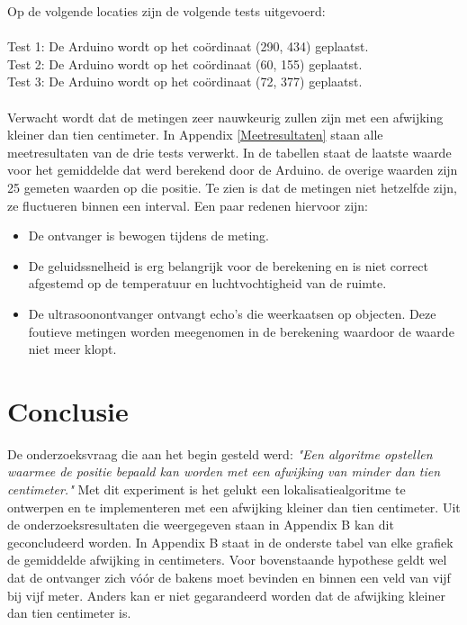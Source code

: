 \documentclass{article}
\begin{document}
Op de volgende locaties zijn de volgende tests uitgevoerd:\\
\\
\indent Test 1: De Arduino wordt op het co\"{o}rdinaat (290, 434) geplaatst. \\
\indent Test 2: De Arduino wordt op het co\"{o}rdinaat (60, 155) geplaatst. \\
\indent Test 3: De Arduino wordt op het co\"{o}rdinaat (72, 377) geplaatst. \\
\\
Verwacht wordt dat de metingen zeer nauwkeurig zullen zijn met een afwijking kleiner dan tien centimeter. 
In Appendix \ref{Meetresultaten} staan alle meetresultaten van de drie tests verwerkt. In de tabellen staat de laatste waarde voor het gemiddelde dat werd berekend door de Arduino. de overige waarden zijn 25 gemeten waarden op die positie. Te zien is dat de metingen niet hetzelfde zijn, ze fluctueren binnen een interval. Een paar redenen hiervoor zijn: 
\begin{itemize}
	\item De ontvanger is bewogen tijdens de meting.
	\item De geluidssnelheid is erg belangrijk voor de berekening en is niet correct afgestemd op de temperatuur en luchtvochtigheid van de ruimte. 
	\item De ultrasoonontvanger ontvangt echo's die weerkaatsen op objecten. Deze foutieve metingen worden meegenomen in de berekening waardoor de waarde niet meer klopt. 
\end{itemize}

\section{Conclusie}
De onderzoeksvraag die aan het begin gesteld werd: \textit{"Een algoritme opstellen waarmee de positie bepaald kan worden met een afwijking van minder dan tien centimeter."} Met dit experiment is het gelukt een lokalisatiealgoritme te ontwerpen en te implementeren met een afwijking kleiner dan tien centimeter. Uit de onderzoeksresultaten die weergegeven staan in Appendix B kan dit geconcludeerd worden. In Appendix B staat in de onderste tabel van elke grafiek de gemiddelde afwijking in centimeters. Voor bovenstaande hypothese geldt wel dat de ontvanger zich v\'{o}\'{o}r de bakens moet bevinden en binnen een veld van vijf bij vijf meter. Anders kan er niet gegarandeerd worden dat de afwijking kleiner dan tien centimeter is. 
\end{document}
